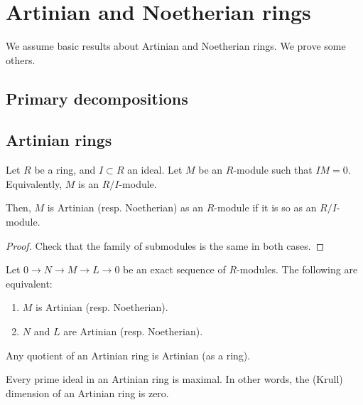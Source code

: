 \documentclass[12pt]{article}
\begin{document}
\coverpage
\thispagestyle{empty}
\updated{\today}
\thispagestyle{empty}
\tableofcontents
\pagestyle{fancy}
\setcounter{page}{1}

\section{Artinian and Noetherian rings}

We assume basic results about Artinian and Noetherian rings. We prove some others.

\subsection{Primary decompositions}

\subsection{Artinian rings}

\begin{prop}
	Let $R$ be a ring, and $I \subset R$ an ideal. Let $M$ be an $R$-module such that $IM = 0$. Equivalently, $M$ is an $R/I$-module.

	Then, $M$ is Artinian (resp. Noetherian) as an $R$-module if it is so as an $R/I$-module.
\end{prop}
\begin{proof} 
	Check that the family of submodules is the same in both cases.
\end{proof}

\begin{prop} \label{prop:artinian-noetherian-two-of-three}
	Let $0 \to N \to M \to L \to 0$ be an exact sequence of $R$-modules. The following are equivalent:
	\begin{enumerate}
		\item $M$ is Artinian (resp. Noetherian).
		\item $N$ and $L$ are Artinian (resp. Noetherian).
	\end{enumerate}
\end{prop}

\begin{cor}
	Any quotient of an Artinian ring is Artinian (as a ring).
\end{cor}

\begin{cor}
	Every prime ideal in an Artinian ring is maximal. In other words, the (Krull) dimension of an Artinian ring is zero.
\end{cor}
\end{document}
